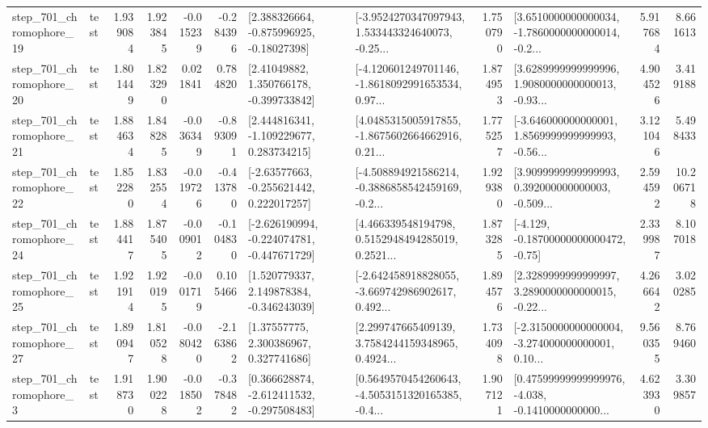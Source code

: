 \begin{tabular}{llrrrrllrlrr}
  step\_701\_chromophore\_19 &      test &      1.939084 &    1.923845 &     -0.015239 & -0.284396 &    [2.388326664, -0.875996925, -0.18027398] &  [-3.9524270347097943, 1.533443324640073, -0.25... &       1.750790 &  [3.6510000000000034, -1.7860000000000014, -0.2... &            5.917684 &          8.661613 \\
  step\_701\_chromophore\_20 &      test &      1.801449 &    1.823290 &      0.021841 &  0.784820 &     [2.41049882, 1.350766178, -0.399733842] &  [-4.120601249701146, -1.8618092991653534, 0.97... &       1.874953 &  [3.6289999999999996, 1.9080000000000013, -0.93... &            4.904526 &          3.419188 \\
  step\_701\_chromophore\_21 &      test &      1.884634 &    1.848285 &     -0.036349 & -0.893091 &    [2.444816341, -1.109229677, 0.283734215] &  [4.0485315005917855, -1.8675602664662916, 0.21... &       1.775257 &  [-3.646000000000001, 1.8569999999999993, -0.56... &            3.121046 &          5.498433 \\
  step\_701\_chromophore\_22 &      test &      1.852280 &    1.832554 &     -0.019726 & -0.413780 &    [-2.63577663, -0.255621442, 0.222017257] &  [-4.508894921586214, -0.3886858542459169, -0.2... &       1.929380 &  [3.9099999999999993, 0.392000000000003, -0.509... &            2.594592 &         10.206718 \\
  step\_701\_chromophore\_24 &      test &      1.884417 &    1.875405 &     -0.009012 & -0.104830 &  [-2.626190994, -0.224074781, -0.447671729] &  [4.466339548194798, 0.5152948494285019, 0.2521... &       1.873285 &              [-4.129, -0.18700000000000472, -0.75] &            2.339987 &          8.107018 \\
  step\_701\_chromophore\_25 &      test &      1.921914 &    1.920195 &     -0.001719 &  0.105466 &    [1.520779337, 2.149878384, -0.346243039] &  [-2.642458918828055, -3.669742986902617, 0.492... &       1.894576 &  [2.3289999999999997, 3.2890000000000015, -0.22... &            4.266642 &          3.020285 \\
  step\_701\_chromophore\_27 &      test &      1.890947 &    1.810528 &     -0.080420 & -2.163862 &      [1.37557775, 2.300386967, 0.327741686] &  [2.299747665409139, 3.7584244159348965, 0.4924... &       1.734098 &  [-2.3150000000000004, -3.274000000000001, 0.10... &            9.560355 &          8.769460 \\
   step\_701\_chromophore\_3 &      test &      1.918730 &    1.900228 &     -0.018502 & -0.378482 &   [0.366628874, -2.612411532, -0.297508483] &  [0.5649570454260643, -4.5053151320165385, -0.4... &       1.907121 &  [0.47599999999999976, -4.038, -0.1410000000000... &            4.623930 &          3.309857 \\

\end{tabular}
